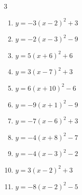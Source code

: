 \begin{multicols}{3}
\begin{enumerate}
        \phantom{$\displaystyle 頂点\left( 8 , -4 \right)$}

  \item $\displaystyle y=-3\left( x-2\right)^{2}+3$

        \phantom{$\displaystyle 頂点\left( 2 , 3 \right)$}

  \item $\displaystyle y=-2\left( x-3\right)^{2}-9$

        \phantom{$\displaystyle 頂点\left( 3 , -9 \right)$}

  \item $\displaystyle y=5\left( x+6\right)^{2}+6$

        \phantom{$\displaystyle 頂点\left( -6 , 6 \right)$}

  \item $\displaystyle y=3\left( x-7\right)^{2}+3$

        \phantom{$\displaystyle 頂点\left( 7 , 3 \right)$}

  \item $\displaystyle y=6\left( x+10\right)^{2}-6$

        \phantom{$\displaystyle 頂点\left( -10 , -6 \right)$}

  \item $\displaystyle y=-9\left( x+1\right)^{2}-9$

        \phantom{$\displaystyle 頂点\left( -1 , -9 \right)$}

  \item $\displaystyle y=-7\left( x-6\right)^{2}+3$

        \phantom{$\displaystyle 頂点\left( 6 , 3 \right)$}

  \item $\displaystyle y=-4\left( x+8\right)^{2}-7$

        \phantom{$\displaystyle 頂点\left( -8 , -7 \right)$}

  \item $\displaystyle y=-4\left( x-3\right)^{2}-2$

        \phantom{$\displaystyle 頂点\left( 3 , -2 \right)$}

  \item $\displaystyle y=3\left( x-2\right)^{2}+3$

        \phantom{$\displaystyle 頂点\left( 2 , 3 \right)$}

  \item $\displaystyle y=-8\left( x-2\right)^{2}-5$

        \phantom{$\displaystyle 頂点\left( 2 , -5 \right)$}


\end{enumerate}
\end{multicols}
